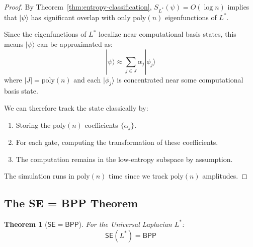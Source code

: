 \documentclass[11pt,a4paper]{article}
\theoremstyle{plain}
\newtheorem{theorem}{Theorem}[section]
\theoremstyle{definition}
\theoremstyle{remark}
\newcommand{\ket}[1]{|#1\rangle}
\newcommand{\BPP}{\mathsf{BPP}}
\newcommand{\SE}{\mathsf{SE}}
\begin{document}
\begin{proof}
By Theorem~\ref{thm:entropy-classification}, $S_{L^*}(\psi) = O(\log n)$ implies that $\ket{\psi}$ has significant overlap with only $\text{poly}(n)$ eigenfunctions of $L^*$.

Since the eigenfunctions of $L^*$ localize near computational basis states, this means $\ket{\psi}$ can be approximated as:
\begin{equation}
    \ket{\psi} \approx \sum_{j \in J} \alpha_j \ket{\phi_j}
\end{equation}
where $|J| = \text{poly}(n)$ and each $\ket{\phi_j}$ is concentrated near some computational basis state.

We can therefore track the state classically by:
\begin{enumerate}
    \item Storing the $\text{poly}(n)$ coefficients $\{\alpha_j\}$.
    \item For each gate, computing the transformation of these coefficients.
    \item The computation remains in the low-entropy subspace by assumption.
\end{enumerate}
The simulation runs in $\text{poly}(n)$ time since we track $\text{poly}(n)$ amplitudes.
\end{proof}

\subsection{The SE = BPP Theorem}

\begin{theorem}[$\SE = \BPP$]\label{thm:se-bpp}
For the Universal Laplacian $L^*$:
\begin{equation}
    \boxed{\SE(L^*) = \BPP}
\end{equation}
\end{theorem}
\end{document}
